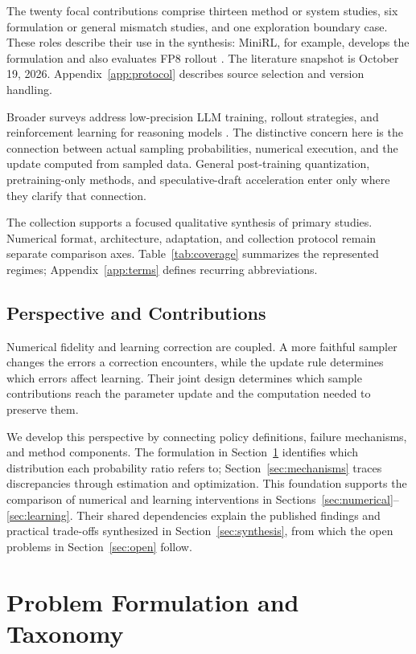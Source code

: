 The twenty focal contributions comprise thirteen method or system studies, six formulation or general mismatch studies, and one exploration boundary case. These roles describe their use in the synthesis: MiniRL, for example, develops the formulation and also evaluates FP8 rollout \citep{minirl}. The literature snapshot is October 19, 2026. Appendix~\ref{app:protocol} describes source selection and version handling.

Broader surveys address low-precision LLM training, rollout strategies, and reinforcement learning for reasoning models \citep{lowprecisionsurvey,rolloutsurvey,reasoningsurvey}. The distinctive concern here is the connection between actual sampling probabilities, numerical execution, and the update computed from sampled data. General post-training quantization, pretraining-only methods, and speculative-draft acceleration enter only where they clarify that connection.

The collection supports a focused qualitative synthesis of primary studies. Numerical format, architecture, adaptation, and collection protocol remain separate comparison axes. Table~\ref{tab:coverage} summarizes the represented regimes; Appendix~\ref{app:terms} defines recurring abbreviations.

\subsection{Perspective and Contributions}
Numerical fidelity and learning correction are coupled. A more faithful sampler changes the errors a correction encounters, while the update rule determines which errors affect learning. Their joint design determines which sample contributions reach the parameter update and the computation needed to preserve them.

We develop this perspective by connecting policy definitions, failure mechanisms, and method components. The formulation in Section~\ref{sec:form} identifies which distribution each probability ratio refers to; Section~\ref{sec:mechanisms} traces discrepancies through estimation and optimization. This foundation supports the comparison of numerical and learning interventions in Sections~\ref{sec:numerical}--\ref{sec:learning}. Their shared dependencies explain the published findings and practical trade-offs synthesized in Section~\ref{sec:synthesis}, from which the open problems in Section~\ref{sec:open} follow.

\section{Problem Formulation and Taxonomy}\label{sec:form}
